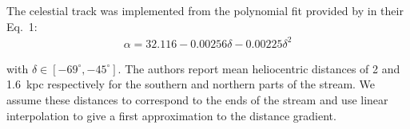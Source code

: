 The celestial track was implemented from the polynomial fit provided by \citet{Grillmair2013} in their Eq.~1:
\begin{eqnarray*}
\alpha = 32.116-0.00256\delta-0.00225\delta^2
\end{eqnarray*}

with $\delta \in [-69^\circ,-45^\circ]$. The authors report mean heliocentric distances of 2 and 1.6~kpc respectively for the southern and northern parts of the stream. We assume these distances to correspond to the ends of the stream and use linear interpolation to give a first approximation to the distance gradient. 

